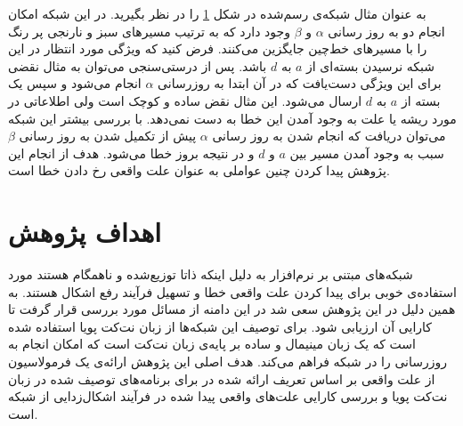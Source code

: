 \begin{figure}
    \centering
    \caption{ }
    \label{fig:blacklist:consistent}
\end{figure}
به عنوان مثال شبکه‌ی رسم‌شده در شکل
\ref{fig:blacklist:consistent}
را در نظر بگیرید.
در این شبکه امکان انجام دو به روز رسانی 
$\alpha$
و
$\beta$
وجود دارد که به ترتیب مسیر‌های سبز و نارنجی پر رنگ‌ را با مسیر‌های خط‌چین جایگزین ‌می‌کنند.
فرض کنید که ویژگی مورد انتظار در این شبکه نرسیدن بسته‌ای از 
$a$
به
$d$
باشد.
پس از درستی‌سنجی می‌توان به مثال نقضی برای این ویژگی دست‌یافت که در آن ابتدا 
به روزرسانی 
$\alpha$
انجام می‌شود و سپس یک بسته از 
$a$
به 
$d$
ارسال می‌شود.
این مثال نقض ساده و کوچک است ولی اطلاعاتی در مورد ریشه یا علت به وجود آمدن این خطا به دست نمی‌دهد.
با بررسی بیشتر این شبکه می‌توان دریافت که انجام شدن به روز رسانی
$\alpha$
پیش از تکمیل شدن به روز رسانی
$\beta$
سبب به وجود آمدن مسیر بین 
$a$
و
$d$
و در نتیجه بروز خطا می‌شود.
هدف از انجام این پژوهش پیدا کردن چنین عواملی به عنوان علت واقعی رخ دادن خطا است.

\section{اهداف پژوهش}
شبکه‌های مبتنی بر نرم‌افزار به دلیل اینکه ذاتا توزیع‌شده و ناهمگام هستند مورد استفاده‌ی خوبی برای پیدا کردن علت واقعی خطا و تسهیل فرآیند رفع اشکال هستند. 
به همین دلیل در این پژوهش سعی شد در این دامنه از مسائل مورد بررسی قرار گرفت تا کارایی آن ارزیابی شود.
برای توصیف این شبکه‌ها از زبان نت‌کت پویا استفاده شده است که یک زبان مینیمال و ساده بر پایه‌ی زبان نت‌کت است که امکان انجام به روزرسانی را در شبکه فراهم می‌کند.
هدف اصلی این پژوهش ارائه‌ی یک فرمولاسیون از علت واقعی بر اساس تعریف ارائه شده در
\cite{hp}
برای برنامه‌های توصیف شده در زبان نت‌کت پویا و بررسی کارایی علت‌های واقعی پیدا شده در فرآیند اشکال‌زدایی از شبکه است.

